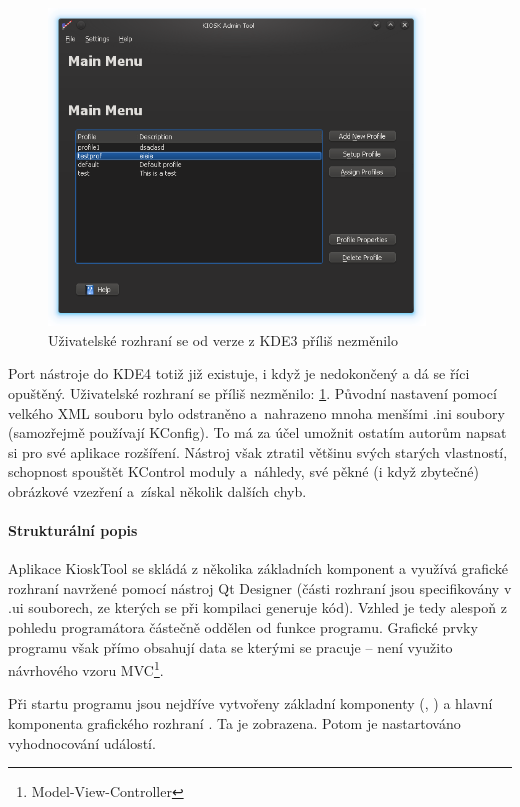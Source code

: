 {\begin{figure}[h]
    \centering
    \includegraphics[width=10cm]{obrazky/KioskToolKDE4/kiosktool_kde4.png}
    \caption{Uživatelské rozhraní se od verze z KDE3 příliš nezměnilo}
    \label{fig:kt4_uvod}
\end{figure}

Port nástroje do KDE4 totiž již existuje, i když je nedokončený a dá se říci opuštěný. Uživatelské rozhraní se příliš nezměnilo: \ref{fig:kt4_uvod}. Původní nastavení pomocí velkého XML souboru bylo odstraněno a~nahrazeno mnoha menšími .ini soubory (samozřejmě používají KConfig). To má za účel umožnit ostatím autorům napsat si pro své aplikace rozšíření. Nástroj však ztratil většinu svých starých vlastností, schopnost spouštět KControl moduly a~náhledy, své pěkné (i když zbytečné) obrázkové vzezření a~získal několik dalších chyb.

\paragraph{Strukturální popis}
Aplikace KioskTool se skládá z několika základních komponent a využívá grafické rozhraní navržené pomocí nástroj Qt Designer (části rozhraní jsou specifikovány v .ui souborech, ze kterých se při kompilaci generuje kód). Vzhled je tedy alespoň z pohledu programátora  částečně oddělen od funkce programu. Grafické prvky programu však přímo obsahují data se kterými se pracuje -- není využito návrhového vzoru MVC\footnote{Model-View-Controller}.

Při startu programu jsou nejdříve vytvořeny základní komponenty (, ) a hlavní komponenta grafického rozhraní . Ta je zobrazena. Potom je nastartováno vyhodnocování událostí.

}
